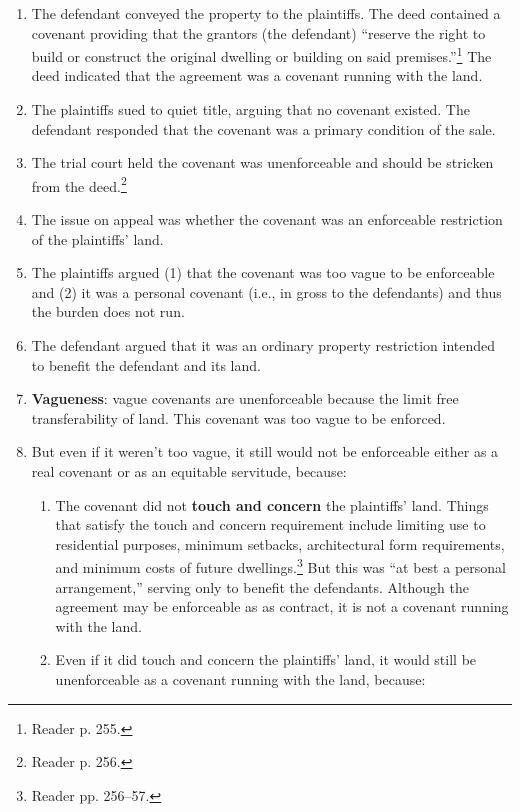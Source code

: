 \begin{enumerate}
    \item The defendant conveyed the property to the plaintiffs. The deed 
    contained a covenant providing that the grantors (the defendant) ``reserve 
    the right to build or construct the original dwelling or building on said 
    premises.''\footnote{Reader p. 255.} The deed indicated that the agreement 
    was a covenant running with the land.
    \item The plaintiffs sued to quiet title, arguing that no covenant 
    existed. The defendant responded that the covenant was a primary condition 
    of the sale.
    \item The trial court held the covenant was unenforceable and should be 
    stricken from the deed.\footnote{Reader p. 256.}
    \item The issue on appeal was whether the covenant was an enforceable 
    restriction of the plaintiffs' land.
    \item The plaintiffs argued (1) that the covenant was too vague to be 
    enforceable and (2) it was a personal covenant (i.e., in gross to the 
    defendants) and thus the burden does not run.
    \item The defendant argued that it was an ordinary property restriction 
    intended to benefit the defendant and its land.
    \item \textbf{Vagueness}: vague covenants are unenforceable because the 
    limit free transferability of land. This covenant was too vague to be 
    enforced.
    \item But even if it weren't too vague, it still would not be enforceable 
    either as a real covenant or as an equitable servitude, because:
    \begin{enumerate}
        \item The covenant did not \textbf{touch and concern} the plaintiffs' 
        land. Things that satisfy the touch and concern requirement include 
        limiting use to residential purposes, minimum setbacks, architectural 
        form requirements, and minimum costs of future 
        dwellings.\footnote{Reader pp. 256--57.} But this was ``at best a 
        personal arrangement,'' serving only to benefit the defendants. 
        Although the agreement may be enforceable as as contract, it is not a 
        covenant running with the land.
        \item Even if it did touch and concern the plaintiffs' land, it would 
        still be unenforceable as a covenant running with the land, because:

\end{enumerate}
\end{enumerate}
